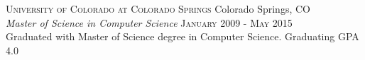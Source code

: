 
\textsc{University of Colorado at Colorado Springs} \hfill Colorado Springs, CO\\
\emph{Master of Science in Computer Science} \hfill \textsc{January 2009} - \textsc{May 2015}\\
Graduated with Master of Science degree in Computer Science.  Graduating GPA 4.0

